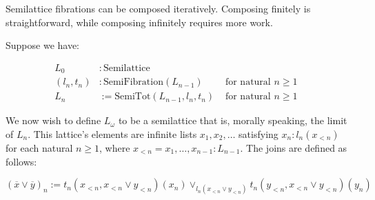 \documentclass{article}
\begin{document}
      Semilattice fibrations can be composed iteratively. Composing finitely is straightforward, while composing infinitely requires more work.

      Suppose we have:

      \begin{align*}
        L_0 &: \mathrm{Semilattice} & \\
        (l_n, t_n) &: \mathrm{SemiFibration}(L_{n-1}) & \text{ for natural $n \geq 1$ } \\
        L_n &:= \mathrm{SemiTot}(L_{n-1}, l_n, t_n)    & \text{ for natural $n \geq 1$ }
      \end{align*}

      We now wish to define $L_\omega$ to be a semilattice that is, morally speaking, the limit of $L_n$. This lattice's elements are infinite lists $x_1, x_2, \ldots$ satisfying $x_n : l_n(x_{<n})$ for each natural $n \geq 1$, where $x_{<n} = x_1, \ldots, x_{n-1} : L_{n-1}$. The joins are defined as follows:

      $$(\overline{x} \vee \overline{y})_n := t_n(x_{<n}, x_{<n} \vee y_{<n})(x_n) \vee_{l_n(x_{<n} \vee y_{<n})} t_n(y_{<n}, x_{<n} \vee y_{<n})(y_n)$$
\end{document}
